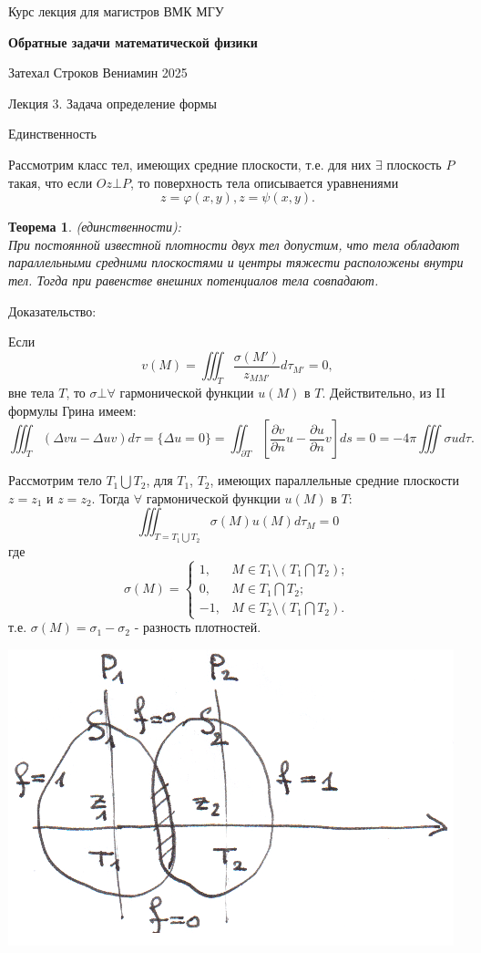 \documentclass{article}
\newtheorem{theorem}{Теорема}
\begin{document}
\centerline{\large Курс лекция для магистров ВМК МГУ}
\centerline {\textbf{\LARGE Обратные задачи математической физики}}
\centerline {Затехал Строков Вениамин 2025}

\vspace{0.4cm}

\centerline{\LARGE Лекция 3. Задача определение формы}

\vspace{1cm}
\centerline{\large Единственность}

Рассмотрим класс тел, имеющих средние плоскости, т.е. для них $\exists$ плоскость $P$ такая, что если $Oz \bot P$, то поверхность тела описывается уравнениями
\[
z = \varphi(x,y), z = \psi(x,y).
\]

\begin{theorem}
(единственности): \\
При постоянной известной плотности двух тел допустим, что тела обладают параллельными средними плоскостями и центры тяжести расположены внутри тел. Тогда при равенстве внешних потенциалов тела совпадают.
\end{theorem}
Доказательство:

Если
\[
v(M) = \iiint_T \dfrac{\sigma(M')}{z_{MM'}} d \tau_{M'} = 0,
\]
вне тела $T$, то $\sigma \bot \forall$ гармонической функции $u(M)$ в $T$. Действительно, из II формулы Грина имеем:
\[
\iiint_T (\Delta v u - \Delta u v) d \tau = \{\Delta u = 0\} = \iint_{\partial T} [\dfrac{\partial v}{\partial n} u - \dfrac{\partial u}{\partial n} v] ds = 0 = - 4 \pi \iiint \sigma u d\tau.
\]

Рассмотрим тело $T_1 \bigcup T_2$, для $T_1$, $T_2$, имеющих параллельные средние плоскости $z = z_1$ и $z = z_2$.
Тогда $\forall$ гармонической функции $u(M)$ в $T$:
\[
\iiint_{T = T_1 \bigcup T_2} \sigma (M) u(M) d\tau_M = 0 
\]
где
\[
\sigma(M) = 
	\begin{cases}
	1, & M \in T_1 \setminus (T_1 \bigcap T_2);\\
	0, & M \in T_1 \bigcap T_2;\\
	-1, &M \in T_2 \setminus (T_1 \bigcap T_2).
	\end{cases}
\]
т.е. $\sigma (M) = \sigma_1 - \sigma_2$ - разность плотностей.

\vspace{0.5cm}
\includegraphics[scale=0.85]{pic1.png}
\end{document}

